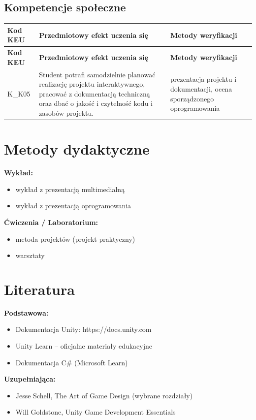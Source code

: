 \documentclass[12pt, a4paper]{article}
\newcommand{\thdrule}{\noalign{\global\setlength{\extrarowheight}{0pt}}}
\newcommand{\thdend}{\noalign{\global\setlength{\extrarowheight}{3pt}}}
\begin{document}
\subsection*{Kompetencje społeczne}
{\scriptsize
\begin{longtable}{m{1.6cm}m{9.0cm}m{4.2cm}}
\thdrule\toprule
\rowcolor{pjatkRed} {\color{white}\footnotesize\textbf{\vphantom{Ag}Kod KEU}} & {\color{white}\footnotesize\textbf{\vphantom{Ag}Przedmiotowy efekt uczenia się}} & {\color{white}\footnotesize\textbf{\vphantom{Ag}Metody weryfikacji}} \\
\midrule\thdend
\endfirsthead
\thdrule\toprule
\rowcolor{pjatkRed} {\color{white}\footnotesize\textbf{\vphantom{Ag}Kod KEU}} & {\color{white}\footnotesize\textbf{\vphantom{Ag}Przedmiotowy efekt uczenia się}} & {\color{white}\footnotesize\textbf{\vphantom{Ag}Metody weryfikacji}} \\
\midrule\thdend
\endhead
  \rowcolor{tableRowLight} K\_K05 & Student potrafi samodzielnie planować realizację projektu interaktywnego, pracować z dokumentacją techniczną oraz dbać o jakość i czytelność kodu i zasobów projektu. & prezentacja projektu i dokumentacji, ocena sporządzonego oprogramowania \\
\bottomrule
\end{longtable}}

\section{Metody dydaktyczne}

\textbf{Wykład:}
\begin{itemize}
  \item wykład z prezentacją multimedialną
  \item wykład z prezentacją oprogramowania
\end{itemize}
\vspace{4pt}
\textbf{Ćwiczenia / Laboratorium:}
\begin{itemize}
  \item metoda projektów (projekt praktyczny)
  \item warsztaty
\end{itemize}
\vspace{4pt}


\section{Literatura}

\textbf{Podstawowa:}
\begin{itemize}
  \item Dokumentacja Unity: https://docs.unity.com
  \item Unity Learn – oficjalne materiały edukacyjne
  \item Dokumentacja C\# (Microsoft Learn)
\end{itemize}

\textbf{Uzupełniająca:}
\begin{itemize}
  \item Jesse Schell, The Art of Game Design (wybrane rozdziały)
  \item Will Goldstone, Unity Game Development Essentials
\end{itemize}
\end{document}
